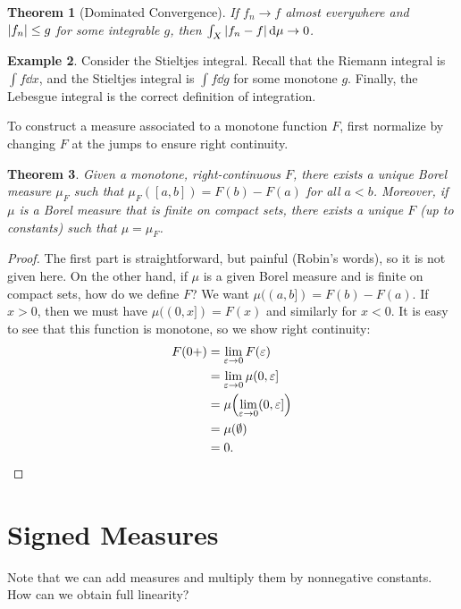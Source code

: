 \documentclass[leqno, openany]{memoir}
\newtheorem{thm}{Theorem}[chapter]
\theoremstyle{definition}
\newtheorem{exm}[thm]{Example}
\theoremstyle{remark}
\theoremstyle{plain}
\theoremstyle{definition}
\theoremstyle{remark}
\newcommand{\ep}{\varepsilon}
\begin{document}
\begin{thm}[Dominated Convergence] If $f_n \to f$ almost everywhere and
$\abs{f_n} \leq g$ for some integrable $g$, then $\int_X \abs{f_n - f} \dd{\mu}
\to 0$.  \end{thm}

\begin{exm} Consider the Stieltjes integral. Recall that the Riemann integral
    is $\int f \dd{x}$, and the Stieltjes integral is $\int f \dd{g}$ for some
    monotone $g$. Finally, the Lebesgue integral is the correct definition of
    integration.  \end{exm}

To construct a measure associated to a monotone function $F$, first normalize
by changing $F$ at the jumps to ensure right continuity.

\begin{thm} Given a monotone, right-continuous $F$, there exists a unique Borel
    measure $\mu_F$ such that $\mu_F([a,b]) = F(b) - F(a)$ for all $a < b$.
    Moreover, if $\mu$ is a Borel measure that is finite on compact sets, there
    exists a unique $F$ (up to constants) such that $\mu = \mu_F$.  \end{thm}

\begin{proof} The first part is straightforward, but painful (Robin's words),
    so it is not given here. On the other hand, if $\mu$ is a given Borel
    measure and is finite on compact sets, how do we define $F$? We want
    $\mu((a,b]) = F(b) - F(a)$. If $x > 0$, then we must have $\mu((0,x]) =
    F(x)$ and similarly for $x < 0$. It is easy to see that this function is
    monotone, so we show right continuity: \begin{align*} F(0+) &= \lim_{\ep
    \to 0} F(\ep) \\ &= \lim_{\ep \to 0} \mu (0,\ep] \\ &= \mu \pqty{\lim_{\ep
    \to 0} (0, \ep] } \\ &= \mu(\emptyset) \\ &= 0.  \end{align*} \end{proof}

\section{Signed Measures}%

Note that we can add measures and multiply them by nonnegative constants. How
can we obtain full linearity?
\end{document}
